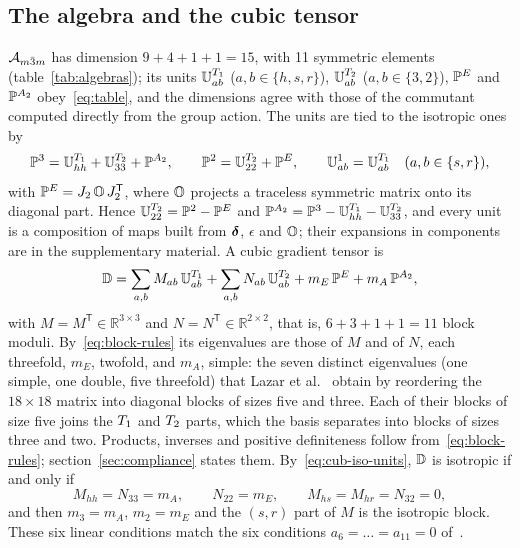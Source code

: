 \subsection{The algebra and the cubic tensor}\label{sec:cubic-algebra}

$\mathcal{A}_{m\bar{3}m}$ has dimension $9+4+1+1=15$, with 11 symmetric elements
(table~\ref{tab:algebras}); its units $\mathbb{U}^{T_1}_{ab}$ ($a,b\in\{h,s,r\}$),
$\mathbb{U}^{T_2}_{ab}$ ($a,b\in\{3,2\}$), $\mathbb{P}^{E}$ and $\mathbb{P}^{A_2}$ obey~\eqref{eq:table}, and the
dimensions agree with those of the commutant computed directly from the group action. The
units are tied to the isotropic ones by
\begin{equation}
\mathbb{P}^{3}=\mathbb{U}^{T_1}_{hh}+\mathbb{U}^{T_2}_{33}+\mathbb{P}^{A_2},\qquad
\mathbb{P}^{2}=\mathbb{U}^{T_2}_{22}+\mathbb{P}^{E},\qquad
\mathbb{U}^{1}_{ab}=\mathbb{U}^{T_1}_{ab}\quad(a,b\in\{s,r\}),\label{eq:cub-iso-units}
\end{equation}
with $\mathbb{P}^{E}=J_{2}\,\mathbb{O}\,J_{2}^{\mathsf T}$, where $\mathbb{O}$ projects a traceless
symmetric matrix onto its diagonal part. Hence $\mathbb{U}^{T_2}_{22}=\mathbb{P}^{2}-\mathbb{P}^{E}$ and
$\mathbb{P}^{A_2}=\mathbb{P}^{3}-\mathbb{U}^{T_1}_{hh}-\mathbb{U}^{T_2}_{33}$, and every unit is a composition of maps
built from $\bm{\delta}$, $\epsilon$ and $\mathbb{O}$; their expansions in components are in the
supplementary material. A cubic gradient tensor is
\begin{equation}
\mathbb{D}=\sum_{a,b}M_{ab}\,\mathbb{U}^{T_1}_{ab}+\sum_{a,b}N_{ab}\,\mathbb{U}^{T_2}_{ab}
+m_E\,\mathbb{P}^{E}+m_A\,\mathbb{P}^{A_2},\label{eq:cub-tensor}
\end{equation}
with $M=M^{\mathsf T}\in\mathbb R^{3\times3}$ and $N=N^{\mathsf T}\in\mathbb R^{2\times2}$,
that is, $6+3+1+1=11$ block moduli. By~\eqref{eq:block-rules} its eigenvalues are those of
$M$ and of $N$, each threefold, $m_E$, twofold, and $m_A$, simple: the seven distinct
eigenvalues (one simple, one double, five threefold) that Lazar et
al.~\cite{Lazar2022} obtain by reordering the $18\times18$ matrix into diagonal blocks of
sizes five and three. Each of their blocks of size five joins the $T_1$ and
$T_2$ parts, which the basis separates into blocks of sizes three and two. Products, inverses and
positive definiteness follow from~\eqref{eq:block-rules}; section~\ref{sec:compliance}
states them. By~\eqref{eq:cub-iso-units}, $\mathbb{D}$ is isotropic if and only if
\begin{equation}
M_{hh}=N_{33}=m_A,\qquad N_{22}=m_E,\qquad M_{hs}=M_{hr}=N_{32}=0,
\label{eq:cub-isotropy}
\end{equation}
and then $m_3=m_A$, $m_2=m_E$ and the $(s,r)$ part of $M$ is the isotropic block. These
six linear conditions match the six conditions $a_6=\dots=a_{11}=0$
of~\cite[eq.~(81)]{Lazar2022}.

